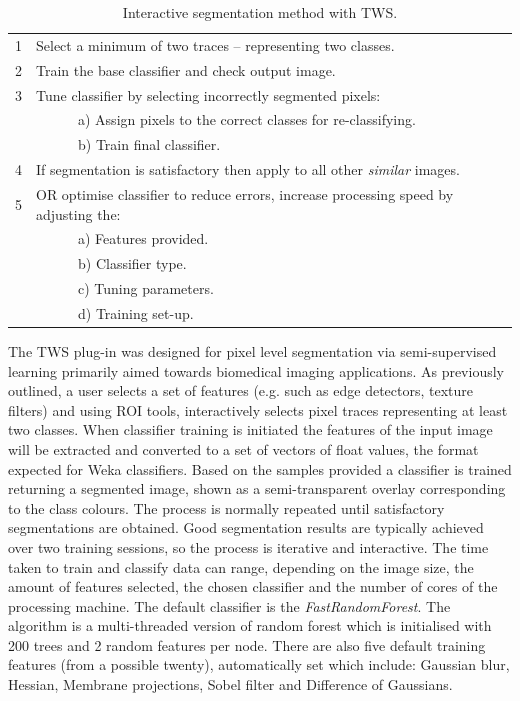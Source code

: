 \begin{table}[!htbp]\myfloatalign \caption[Interactive segmentation method.]{Interactive segmentation method with \ac{TWS}.}\label{tab:tws-general} 
\begin{tabular}{lp{3.9in}}\toprule
1 & Select a minimum of two traces -- representing two classes.\\
2 & Train the base classifier and check output image.\\
3 & Tune classifier by selecting incorrectly segmented pixels: \\
& \ \ \ \ \ \ a) Assign pixels to the correct classes for re-classifying. \\
& \ \ \ \ \ \ b) Train final classifier. \\
4 & If segmentation is satisfactory then apply to all other \emph{similar} images.\\
5 & OR optimise classifier to reduce errors, increase processing speed by adjusting the: \\ 
& \ \ \ \ \ \ a) Features provided.\\
& \ \ \ \ \ \ b) Classifier type. \\
& \ \ \ \ \ \ c) Tuning parameters. \\
& \ \ \ \ \ \ d) Training set-up. \\
\bottomrule
\end{tabular}
\end{table}

The \ac{TWS} plug-in was designed for pixel level segmentation via semi-supervised learning primarily aimed towards biomedical imaging applications. As previously outlined, a user selects a set of features (e.g. such as edge detectors, texture filters) and using ROI tools, interactively selects pixel traces representing at least two classes. When classifier training is initiated the features of the input image will be extracted and converted to a set of vectors of float values, the format expected for Weka classifiers. Based on the samples provided a classifier is trained returning a segmented image, shown as a semi-transparent overlay corresponding to the class colours. The process is normally repeated until satisfactory segmentations are obtained. Good segmentation results are typically achieved over two training sessions, so the process is iterative and interactive. The time taken to train and classify data can range, depending on the image size, the amount of features selected, the chosen classifier and the number of cores of the processing machine. The default classifier is the \emph{FastRandomForest}. The algorithm is a multi-threaded version of random forest which is initialised with 200 trees and 2 random features per node. There are also five default training features (from a possible twenty), automatically set which include: Gaussian blur, Hessian, Membrane projections, Sobel filter and Difference of Gaussians. 

